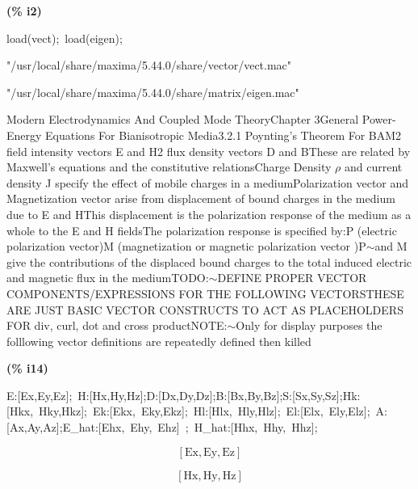 \documentclass[fleqn]{article}
\begin{document}
\noindent
\begin{minipage}[t]{4.000000em}\color{red}\bfseries
(\% i2)	
\end{minipage}
\begin{minipage}[t]{\textwidth}\color{blue}
load(vect);\ load(eigen);
\end{minipage}
\[\displaystyle \tag{\% o1} 
\mbox{}
\]"/usr/local/share/maxima/5.44.0/share/vector/vect.mac"


\[\tag{\% o2} 
\mbox{}
\]"/usr/local/share/maxima/5.44.0/share/matrix/eigen.mac"

Modern Electrodynamics And Coupled Mode TheoryChapter 3General Power-Energy Equations For Bianisotropic Media3.2.1 Poynting's Theorem For BAM2 field intensity vectors E and H2 flux density vectors D and BThese are related by Maxwell's equations and the constitutive relationsCharge Density \ensuremath{\rho} and current density J specify the effect of mobile charges in a mediumPolarization vector and Magnetization vector arise from displacement of bound charges in the medium due to E and HThis displacement is the polarization response of the medium as a whole to the E and H fieldsThe polarization response is specified by:P (electric polarization vector)M (magnetization or magnetic polarization vector )P\ensuremath{\sim }and M give the contributions of the displaced bound charges to the total induced electric and magnetic flux in the mediumTODO:\ensuremath{\sim }DEFINE PROPER VECTOR COMPONENTS/EXPRESSIONS FOR THE FOLLOWING VECTORSTHESE ARE JUST BASIC VECTOR CONSTRUCTS TO ACT AS PLACEHOLDERS FOR div, curl, dot and cross productNOTE:\ensuremath{\sim }Only for display purposes the folllowing vector definitions are repeatedly defined then killed


\noindent
\begin{minipage}[t]{4.000000em}\color{red}\bfseries
(\% i14)	
\end{minipage}
\begin{minipage}[t]{\textwidth}\color{blue}
E:[Ex,Ey,Ez];\ H:[Hx,Hy,Hz];D:[Dx,Dy,Dz];B:[Bx,By,Bz];S:[Sx,Sy,Sz];Hk:[Hkx,\ Hky,Hkz];\ Ek:[Ekx,\ Eky,Ekz];\ Hl:[Hlx,\ Hly,Hlz];\ El:[Elx,\ Ely,Elz];\ A:[Ax,Ay,Az];E\_hat:[Ehx,\ Ehy,\ Ehz]\ ;\ H\_hat:[Hhx,\ Hhy,\ Hhz];
\end{minipage}
\[\displaystyle \tag{E} 
\left[ \ensuremath{\mathrm{Ex}}\operatorname{,}\ensuremath{\mathrm{Ey}}\operatorname{,}\ensuremath{\mathrm{Ez}}\right] \mbox{}\]

\[\tag{H} 
\left[ \ensuremath{\mathrm{Hx}}\operatorname{,}\ensuremath{\mathrm{Hy}}\operatorname{,}\ensuremath{\mathrm{Hz}}\right] \mbox{}\]
\end{document}
